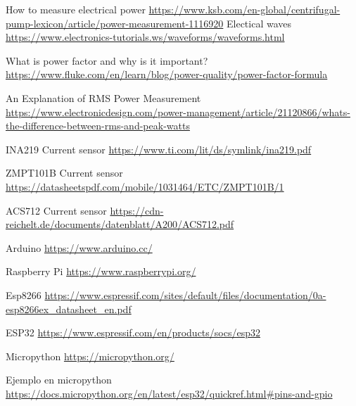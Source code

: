 
\begin{thebibliography}{9}
How to measure electrical power \url{https://www.ksb.com/en-global/centrifugal-pump-lexicon/article/power-measurement-1116920}
Electical waves \url{https://www.electronics-tutorials.ws/waveforms/waveforms.html}

What is power factor and why is it important? \url{https://www.fluke.com/en/learn/blog/power-quality/power-factor-formula}

An Explanation of RMS Power Measurement \url{https://www.electronicdesign.com/power-management/article/21120866/whats-the-difference-between-rms-and-peak-watts}

INA219 Current sensor \url{https://www.ti.com/lit/ds/symlink/ina219.pdf}

ZMPT101B Current sensor \url{https://datasheetspdf.com/mobile/1031464/ETC/ZMPT101B/1}

ACS712 Current sensor \url{https://cdn-reichelt.de/documents/datenblatt/A200/ACS712.pdf}

Arduino \url{https://www.arduino.cc/}

Raspberry Pi \url{https://www.raspberrypi.org/}

Esp8266 \url{https://www.espressif.com/sites/default/files/documentation/0a-esp8266ex_datasheet_en.pdf}

ESP32 \url{https://www.espressif.com/en/products/socs/esp32}

Micropython \url{https://micropython.org/}

Ejemplo en micropython \url{https://docs.micropython.org/en/latest/esp32/quickref.html#pins-and-gpio}


\end{thebibliography}
